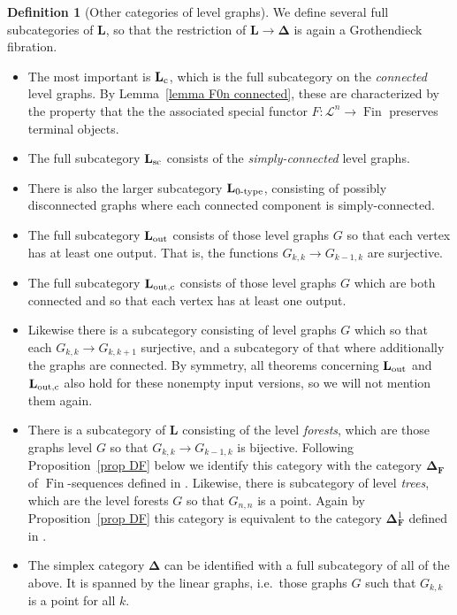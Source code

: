 \documentclass{amsart}
\numberwithin{theorem}{subsection}
\theoremstyle{definition}
\newtheorem{definition}[theorem]{Definition}
\newcommand{\finset}{\operatorname{Fin}}
\newcommand{\finsetskel}{\mathbf{F}}
\newcommand{\name}[1]{\ensuremath{\text{\textup{#1}}}}
\newcommand{\simp}{\mathbf{\Delta}}
\newcommand{\levelg}{\mathbf{L}}
\newcommand{\levelgconn}{\levelg_{\name{c}}}
\newcommand{\scriptyell}{\mathscr L}
\begin{document}
\begin{definition}[Other categories of level graphs]
\label{def subcategories of levelg}
We define several full subcategories of $\levelg$, so that the restriction of $\levelg \to \simp$ is again a Grothendieck fibration.
\begin{itemize}
\item The most important is $\levelgconn$, which is the full subcategory on the \emph{connected} level graphs.
By Lemma~\ref{lemma F0n connected}, these are characterized by the property that the the associated special functor $F \colon \scriptyell^n \to \finset$ preserves terminal objects.
\item The full subcategory $\levelg_{\name{sc}}$ consists of the \emph{simply-connected} level graphs.
\item There is also the larger subcategory $\levelg_{\name{0-type}}$, consisting of possibly disconnected graphs where each connected component is simply-connected.
\item The full subcategory $\levelg_{\name{out}}$ consists of those level graphs $G$ so that each vertex has at least one output. That is, the functions $G_{k,k} \to G_{k-1,k}$ are surjective.
\item The full subcategory $\levelg_{\name{out,c}}$ consists of those level graphs $G$ which are both connected and so that each vertex has at least one output.
\item Likewise there is a subcategory consisting of level graphs $G$ which so that each $G_{k,k} \to G_{k,k+1}$ surjective, and a subcategory of that where additionally the graphs are connected.
By symmetry, all theorems concerning $\levelg_{\name{out}}$ and $\levelg_{\name{out,c}}$ also hold for these nonempty input versions, so we will not mention them again.
\item There is a subcategory of $\levelg$ consisting of the level \emph{forests}, which are those graphs level $G$ so that $G_{k,k} \to G_{k-1,k}$ is bijective.
Following Proposition~\ref{prop DF} below we identify this category with the category $\simp_\finsetskel$ of $\finset$-sequences defined in \cite{bar}. 
Likewise, there is subcategory of level \emph{trees}, which are the level forests $G$ so that $G_{n,n}$ is a point. 
Again by Proposition~\ref{prop DF} this category is equivalent to the category $\simp^1_\finsetskel$ defined in \cite{ChuHaugsengHeuts}.
\item The simplex category $\simp$ can be identified with a full subcategory of all of the above.
It is spanned by the linear graphs, i.e.\ those graphs $G$ such that $G_{k,k}$ is a point for all $k$.
\end{itemize}
\end{definition}
\end{document}

